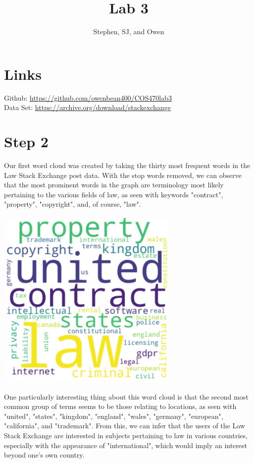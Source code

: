 \documentclass{article}
\title{Lab 3}
\author{Stephen, SJ, and Owen}
\begin{document}
\maketitle


\section{Links}

Github: \href{https://github.com/owenbean400/COS470lab3}{https://github.com/owenbean400/COS470lab3} \\
Data Set: \href{https://archive.org/download/stackexchange}{https://archive.org/download/stackexchange}

\section{Step 2}

Our first word cloud was created by taking the thirty most frequent words in the Law Stack Exchange post data. With the stop words removed, we can observe that the most prominent words in the graph are terminology most likely pertaining to the various fields of law, as seen with keywords "contract", "property", "copyright", and, of course, "law". 

\begin{center}
\includegraphics[width=3.5in]{images/image2.png}
\end{center}

One particularly interesting thing about this word cloud is that the second most common group of terms seems to be those relating to locations, as seen with "united", "states", "kingdom", "england", "wales", "germany", "european", "california", and "trademark". From this, we can infer that the users of the Law Stack Exchange are interested in subjects pertaining to law in various countries, especially with the appearance of "international", which would imply an interest beyond one's own country. 
\end{document}
